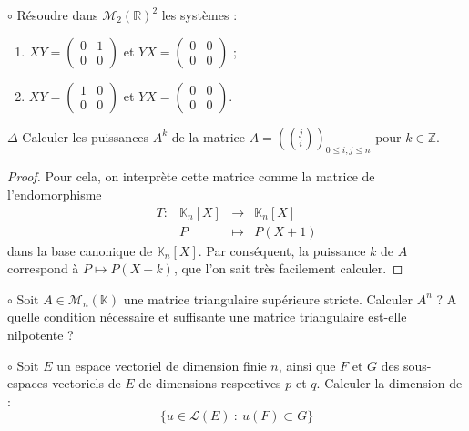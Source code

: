 \documentclass[french,a4paper]{article}
\newcommand{\Z}{\mathbb{Z}}
\newcommand{\R}{\mathbb{R}}
\newcommand{\K}{\mathbb{K}}
\theoremstyle{plain}
\theoremstyle{definition}
\theoremstyle{remark}
\begin{document}
\begin{ex}{$\circ$}
	Résoudre dans $\mathcal{M}_2(\R)^2$ les systèmes :
	\begin{enumerate}
		\item $XY=\displaystyle\begin{pmatrix}
			0&1\\
			0&0
		\end{pmatrix}$ et $YX=\displaystyle\begin{pmatrix}
		0&0\\
		0&0
		\end{pmatrix}$ ;
		\item $XY=\displaystyle\begin{pmatrix}
			1&0\\
			0&0
		\end{pmatrix}$ et $YX=\displaystyle\begin{pmatrix}
			0&0\\
			0&0
		\end{pmatrix}$.
	\end{enumerate}
\end{ex}

\begin{ex}{$\Delta$}
	Calculer les puissances $A^k$ de la matrice $A=\displaystyle\left(\binom{j}{i}\right)_{0\leqslant i,j\leqslant n}$ pour $k\in\Z$.
\end{ex}
\begin{proof}
	Pour cela, on interprète cette matrice comme la matrice de l'endomorphisme $$\begin{array}{lrcl}
		T:&\K_n[X]&\longrightarrow&\K_n[X]\\
		&P&\longmapsto&P(X+1)
	\end{array}$$ dans la base canonique de $\K_n[X]$. Par conséquent, la puissance $k$ de $A$ correspond à $P\mapsto P(X+k)$, que l'on sait très facilement calculer.
\end{proof}

\begin{ex}{$\circ$}
	Soit $A\in\mathcal{M}_n(\K)$ une matrice triangulaire supérieure stricte. Calculer $A^n$ ? A quelle condition nécessaire et suffisante une matrice triangulaire est-elle nilpotente ?
\end{ex}

\begin{ex}{$\circ$}
	Soit $E$ un espace vectoriel de dimension finie $n$, ainsi que $F$ et $G$ des sous-espaces vectoriels de $E$ de dimensions respectives $p$ et $q$. Calculer la dimension de : $$\{u\in\mathcal{L}(E)\ :\ u(F)\subset G\}$$
\end{ex}
\end{document}
